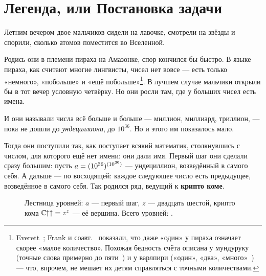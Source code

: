 \section{Легенда, или Постановка задачи}

Летним вечером двое мальчиков сидели на лавочке, смотрели на звёзды и спорили,
сколько атомов поместится во Вселенной.

Родись они в племени пираха на Амазонке, спор кончился бы быстро. В языке пираха, как
считают многие лингвисты, чисел нет вовсе --- есть только «немного», «побольше» и «ещё
побольше»\footnote{Everett~\cite{everett2005}; Frank и соавт.~\cite{frank2008} показали,
что даже «один» у пираха означает скорее «малое количество». Похожая бедность счёта
описана у мундуруку (точные слова примерно до пяти~\cite{pica2004}) и у варлпири
(«один», «два», «много»~\cite{butterworth2008}) --- что, впрочем, не мешает их детям
справляться с точными количествами.}. В лучшем случае мальчики открыли бы в тот вечер
условную четвёрку. Но они росли там, где у больших чисел есть имена.

И они называли числа всё больше и больше --- миллион, миллиард, триллион, --- пока не
дошли до \emph{ундециллиона}, до \(10^{36}\). Но и этого им показалось мало.

Тогда они поступили так, как поступает всякий математик, столкнувшись с числом, для
которого ещё нет имени: они дали имя. Первый шаг они сделали сразу большим: пусть
\(a = (10^{36})^{(10^{36})}\) --- ундециллион, возведённый в самого себя. А дальше
--- по восходящей: каждое следующее число есть предыдущее, возведённое в самого себя.
Так родился ряд, ведущий к \textbf{крипто коме}.

\begin{figure}[h]
\centering
{}
\caption{Лестница уровней: \(a\) --- первый шаг, \(z\) --- двадцать шестой,
крипто кома \(\mathbb{C}\mkern-1.5mu{\uparrow\uparrow} = z^{z}\) --- её вершина. Всего уровней: \nlevels.}
\label{fig:ladder}
\end{figure}
